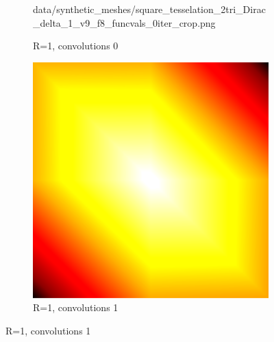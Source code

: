 \begin{figure}[ht]
\begin{subfigure}[b]{0.32\linewidth}
		{data/synthetic_meshes/square_tesselation_2tri_Dirac_delta_1_v9_f8_funcvals_0iter_crop.png}
		\caption{R=1, convolutions 0}\label{fig:sq2.b}
	\end{subfigure}
	\begin{subfigure}[b]{0.32\linewidth}
		\includegraphics[width=\linewidth]
		{data/synthetic_meshes/square_tesselation_2tri_Dirac_delta_1_v9_f8_funcvals_1iter_crop.png}
		\caption{R=1, convolutions 1}\label{fig:sq2.c}
	\end{subfigure}


\end{figure}
